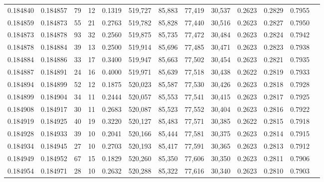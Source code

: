 \begin{tabular}{rrrrrrrrrrrrr}
0.184840 & 0.184857 &    79 &  12 &                                     0.1319 & 519,727 &  85,883 &  77,419 &  30,537 & 0.2623 & 0.2829 & 0.7955 \\
0.184859 & 0.184873 &    55 &  21 &                                     0.2763 & 519,782 &  85,828 &  77,440 &  30,516 & 0.2623 & 0.2827 & 0.7950 \\
0.184873 & 0.184878 &    93 &  32 &                                     0.2560 & 519,875 &  85,735 &  77,472 &  30,484 & 0.2623 & 0.2824 & 0.7942 \\
0.184878 & 0.184884 &    39 &  13 &                                     0.2500 & 519,914 &  85,696 &  77,485 &  30,471 & 0.2623 & 0.2823 & 0.7938 \\
0.184884 & 0.184886 &    33 &  17 &                                     0.3400 & 519,947 &  85,663 &  77,502 &  30,454 & 0.2623 & 0.2821 & 0.7935 \\
0.184887 & 0.184891 &    24 &  16 &                                     0.4000 & 519,971 &  85,639 &  77,518 &  30,438 & 0.2622 & 0.2819 & 0.7933 \\
0.184894 & 0.184899 &    52 &  12 &                                     0.1875 & 520,023 &  85,587 &  77,530 &  30,426 & 0.2623 & 0.2818 & 0.7928 \\
0.184899 & 0.184904 &    34 &  11 &                                     0.2444 & 520,057 &  85,553 &  77,541 &  30,415 & 0.2623 & 0.2817 & 0.7925 \\
0.184908 & 0.184917 &    30 &  11 &                                     0.2683 & 520,087 &  85,523 &  77,552 &  30,404 & 0.2623 & 0.2816 & 0.7922 \\
0.184919 & 0.184925 &    40 &  19 &                                     0.3220 & 520,127 &  85,483 &  77,571 &  30,385 & 0.2622 & 0.2815 & 0.7918 \\
0.184928 & 0.184933 &    39 &  10 &                                     0.2041 & 520,166 &  85,444 &  77,581 &  30,375 & 0.2623 & 0.2814 & 0.7915 \\
0.184934 & 0.184945 &    27 &  10 &                                     0.2703 & 520,193 &  85,417 &  77,591 &  30,365 & 0.2623 & 0.2813 & 0.7912 \\
0.184949 & 0.184952 &    67 &  15 &                                     0.1829 & 520,260 &  85,350 &  77,606 &  30,350 & 0.2623 & 0.2811 & 0.7906 \\
0.184954 & 0.184971 &    28 &  10 &                                     0.2632 & 520,288 &  85,322 &  77,616 &  30,340 & 0.2623 & 0.2810 & 0.7903 \\

\end{tabular}

